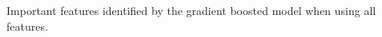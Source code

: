Important features identified by the gradient boosted model when using all features.
\label{fig:GBFeatures}